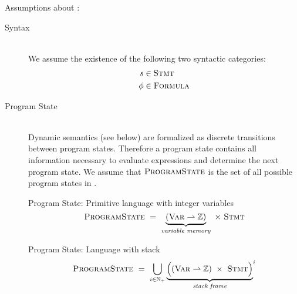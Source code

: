 Assumptions about \svl:
\begin{description}
\item[Syntax]~\\
    We assume the existence of the following two syntactic categories:
    \begin{align*}
    	s    & \in \textup{\textsc{Stmt}}    \\
    	\phi & \in \textup{\textsc{Formula}}
    \end{align*}
    
    
    \begin{comment}
    Let $\setStmt_s$ be the set of all statements having $s$ as prefix.
    \end{comment}
    
    
    
\item[Program State]~\\
    Dynamic semantics (see below) are formalized as discrete transitions between program states.
    Therefore a program state contains all information necessary to evaluate expressions and determine the next program state.
    We assume that $\textup{\textsc{ProgramState}}$ is the set of all possible program states in \svl.
    
    \begin{example}{Program State: Primitive language with integer variables}
        \label{ex:ps-primitive}
        \begin{displaymath}
        \textup{\textsc{ProgramState}} ~=~ \underbrace{(\textup{\textsc{Var}} \rightharpoonup \mathbb{Z})}_{\textit{variable memory}} ~\times~ \textup{\textsc{Stmt}} 
        \end{displaymath}
    \end{example}
    \begin{example}{Program State: Language with stack}
        \label{ex:ps-stacked}
        \begin{displaymath}
        \textup{\textsc{ProgramState}} ~=~ \bigcup_{i \in \mathbb{N}_+}{\underbrace{\Big((\textup{\textsc{Var}} \rightharpoonup \mathbb{Z}) ~\times~ \textup{\textsc{Stmt}} \Big)}_{\textit{stack frame}}}^i                                                      
        \end{displaymath}
    \end{example}
    

\end{description}
